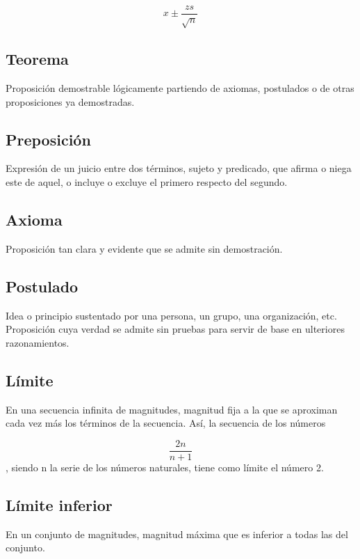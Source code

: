     \begin{equation}
        \label{eq1}
        x {\pm} {\frac{zs}{\sqrt{n}}}
    \end{equation}
    
    \subsection{Teorema}
    Proposición demostrable lógicamente partiendo de axiomas, postulados o de otras proposiciones ya demostradas.\cite{RAE}
    
    \subsection{Preposición}
    Expresión de un juicio entre dos términos, sujeto y predicado, que afirma o niega este de aquel, o incluye o excluye el primero respecto del segundo. \cite{RAE}
    
    \subsection{Axioma}
    Proposición tan clara y evidente que se admite sin demostración.\cite{RAE}
    
    \subsection{Postulado}
     Idea o principio sustentado por una persona, un grupo, una organización, etc. Proposición cuya verdad se admite sin pruebas para servir de base en ulteriores razonamientos.\cite{RAE}
     
    \subsection{Límite}
     En una secuencia infinita de magnitudes, magnitud fija a la que se aproximan cada vez más los términos de la secuencia. Así, la secuencia de los números 
     
    \begin{equation}
    \label{eq1}
        {\frac{2n}{n+1}}
    \end{equation}
    , siendo n la serie de los números naturales, tiene como límite el número 2.\cite{RAE}
    
    
    \subsection{Límite inferior}
    En un conjunto de magnitudes, magnitud máxima que es inferior a todas las del conjunto.\cite{RAE}
    
